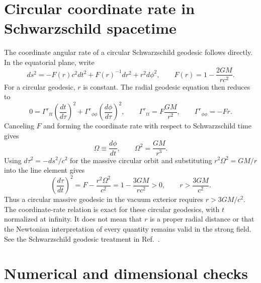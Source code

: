 \documentclass[12pt]{article}
\begin{document}
\appendix

\section{Circular coordinate rate in Schwarzschild spacetime}
\label{app:schwarzschild-orbit}

The coordinate angular rate of a circular Schwarzschild geodesic follows directly. In the equatorial plane, write
\begin{equation}
  ds^2=-F(r)c^2dt^2+F(r)^{-1}dr^2+r^2d\phi^2,
  \qquad
  F(r)=1-\frac{2GM}{rc^2}.
  \label{eq:schwarzschild-equatorial}
\end{equation}
For a circular geodesic, $r$ is constant. The radial geodesic equation then reduces to
\begin{equation}
  0=\Gamma^r{}_{tt}\left(\frac{dt}{d\tau}\right)^2
    +\Gamma^r{}_{\phi\phi}\left(\frac{d\phi}{d\tau}\right)^2,
  \qquad
  \Gamma^r{}_{tt}=F\frac{GM}{r^2},
  \qquad
  \Gamma^r{}_{\phi\phi}=-Fr.
  \label{eq:circular-radial-geodesic}
\end{equation}
Canceling $F$ and forming the coordinate rate with respect to Schwarzschild time gives
\begin{equation}
  \Omega\equiv\frac{d\phi}{dt},
  \qquad
  \Omega^2=\frac{GM}{r^3}.
  \label{eq:schwarzschild-coordinate-rate}
\end{equation}
Using $d\tau^2=-ds^2/c^2$ for the massive circular orbit and substituting $r^2\Omega^2=GM/r$ into the line element gives
\begin{equation}
  \left(\frac{d\tau}{dt}\right)^2
  =F-\frac{r^2\Omega^2}{c^2}
  =1-\frac{3GM}{rc^2}>0,
  \qquad
  r>\frac{3GM}{c^2}.
  \label{eq:circular-timelike-condition}
\end{equation}
Thus a circular massive geodesic in the vacuum exterior requires $r>3GM/c^2$. The coordinate-rate relation is exact for these circular geodesics, with $t$ normalized at infinity. It does not mean that $r$ is a proper radial distance or that the Newtonian interpretation of every quantity remains valid in the strong field. See the Schwarzschild geodesic treatment in Ref.~\cite{TongGR}.

\section{Numerical and dimensional checks}
\label{app:numerical-checks}
\end{document}
